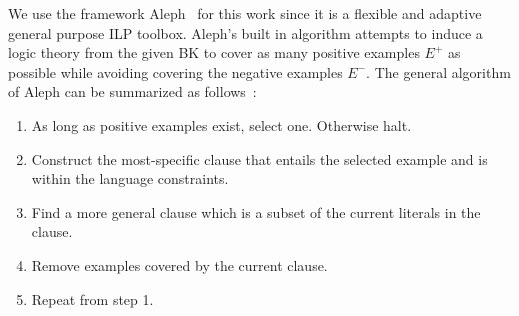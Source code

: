 We use the framework Aleph~\cite{srinivasan2001aleph}
for this work since it is a flexible and adaptive general purpose ILP
toolbox. Aleph's built in algorithm attempts to induce a logic theory
from the given BK to cover as many positive examples $E^+$ as possible
while avoiding covering the negative examples $E^-$. The general
algorithm of Aleph can be summarized as
follows~\cite{srinivasan2001aleph}:

\begin{enumerate}
\item As long as positive examples exist, select one. Otherwise halt.
\item Construct the most-specific clause that entails the selected example and is within the language constraints.
\item Find a more general clause which is a subset of the current literals in the clause.
\item Remove examples covered by the current clause.
\item Repeat from step 1.
\end{enumerate}



